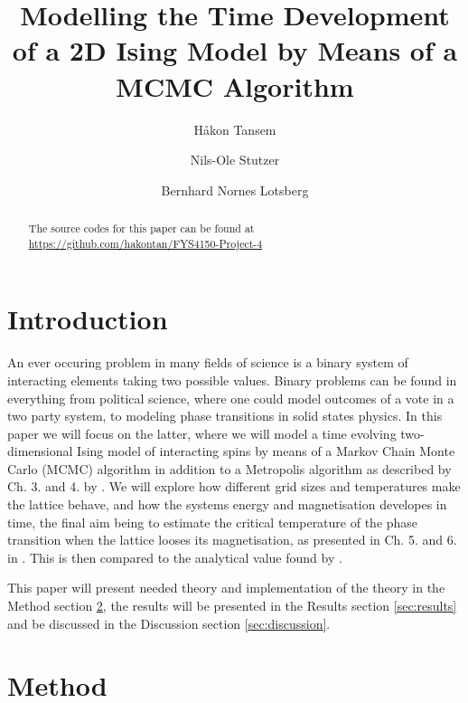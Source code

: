 \documentclass[twocolumn]{aastex62}
\begin{document}
\title{\Large Modelling the Time Development of a 2D Ising Model by Means of a MCMC Algorithm}

\author{Håkon Tansem}

\author{Nils-Ole Stutzer}

\author{Bernhard Nornes Lotsberg}

\begin{abstract}
	

	The source codes for this paper can be found at \url{https://github.com/hakontan/FYS4150-Project-4}

\end{abstract}

\section{Introduction} \label{sec:intro}
An ever occuring problem in many fields of science is a binary system of
interacting elements taking two possible values. Binary problems can be found in
everything from political science, where one could model outcomes of a vote in a
two party system, to modeling phase transitions in solid states physics. In this
paper we will focus on the latter, where we will model a time evolving
two-dimensional Ising model of interacting spins by means of a Markov Chain
Monte Carlo (MCMC) algorithm in addition to a Metropolis algorithm as described
by Ch. 3. and 4. by \cite{newman:2019}. We will explore how
different grid sizes and temperatures make the lattice behave, and how the systems energy and magnetisation
developes in time, the final aim being to estimate the critical temperature of
the phase transition when the lattice looses its magnetisation, as presented in
Ch. 5. and 6. in \cite{plischke:2006}. This is then
compared to the analytical value found by \cite{onsager:1944}.

This paper will present needed theory and implementation of the theory in the Method
section \ref{sec:method}, the results will be presented in the Results section
\ref{sec:results} and be discussed in the Discussion section
\ref{sec:discussion}.

\section{Method} \label{sec:method}
\end{document}
